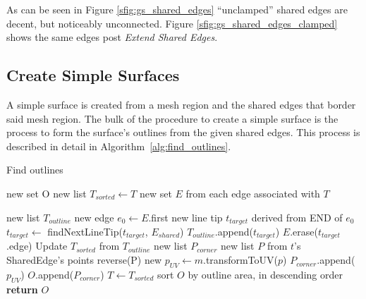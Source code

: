 As can be seen in Figure \ref{sfig:gs_shared_edges} ``unclamped'' shared edges are decent, but noticeably unconnected.
Figure \ref{sfig:gs_shared_edges_clamped} shows the same edges post \textit{Extend Shared Edges}.

\subsection{Create Simple Surfaces}
A simple surface is created from a mesh region and the shared edges that border said mesh region.
The bulk of the procedure to create a simple surface is the process to form the surface's outlines from the given shared edges.
This process is described in detail in Algorithm~\ref{alg:find_outlines}.

\begin{algorithm}[!htb]
	\caption{Find outlines}\label{alg:find_outlines}
\begin{algorithmic}[1]
	\State new set O 
	\State new list $T_{sorted} \leftarrow T$ 
	\State new set $E$ from each edge associated with $T$

		\State new list $T_{outline}$ 
		\State new edge $e_0 \leftarrow E$.first
		\State new line tip $t_{target}$ derived from END of $e_0$
		\Repeat
			\State $t_{target} \leftarrow$ findNextLineTip($t_{target}$, $E_{shared}$)
			\State $T_{outline}$.append($t_{target}$)
			\State $E$.erase($t_{target}$.edge)
		\State Update $T_{sorted}$ from $T_{outline}$
		\State new list $P_{corner}$
			\State new list $P$ from $t$'s SharedEdge's points
				\State reverse(P)
			\EndIf
				\State new $p_{UV} \leftarrow m$.transformToUV($p$)
				\State $P_{corner}$.append($p_{UV}$)
			\EndFor
		\EndFor
		\State $O$.append($P_{corner}$)
	\EndWhile
	\State $T \leftarrow T_{sorted}$
	\State sort $O$ by outline area, in descending order \label{alg:outlines:sort_O}
	\State \textbf{return} $O$
\EndFunction
\end{algorithmic}
\end{algorithm}

